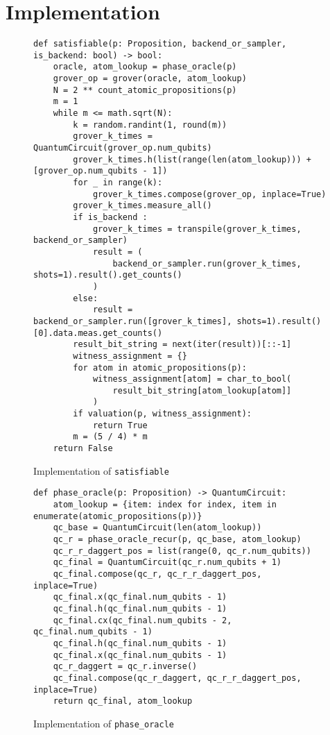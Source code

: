 \section{Implementation}\label{sec:implementation}

\begin{figure}
\centering
\begin{verbatim}
def satisfiable(p: Proposition, backend_or_sampler, is_backend: bool) -> bool:
    oracle, atom_lookup = phase_oracle(p)
    grover_op = grover(oracle, atom_lookup)
    N = 2 ** count_atomic_propositions(p)
    m = 1
    while m <= math.sqrt(N):
        k = random.randint(1, round(m))
        grover_k_times = QuantumCircuit(grover_op.num_qubits)
        grover_k_times.h(list(range(len(atom_lookup))) + [grover_op.num_qubits - 1])
        for _ in range(k):
            grover_k_times.compose(grover_op, inplace=True)
        grover_k_times.measure_all()
        if is_backend :
            grover_k_times = transpile(grover_k_times, backend_or_sampler)
            result = (
                backend_or_sampler.run(grover_k_times, shots=1).result().get_counts()
            )
        else:
            result = backend_or_sampler.run([grover_k_times], shots=1).result()[0].data.meas.get_counts()
        result_bit_string = next(iter(result))[::-1]
        witness_assignment = {}
        for atom in atomic_propositions(p):
            witness_assignment[atom] = char_to_bool(
                result_bit_string[atom_lookup[atom]]
            )
        if valuation(p, witness_assignment):
            return True
        m = (5 / 4) * m
    return False
\end{verbatim}
\caption{Implementation of \texttt{satisfiable} }
\label{fig:satisfiable}
\end{figure}

\begin{figure}
\centering
\begin{verbatim}
def phase_oracle(p: Proposition) -> QuantumCircuit:
    atom_lookup = {item: index for index, item in enumerate(atomic_propositions(p))}
    qc_base = QuantumCircuit(len(atom_lookup))
    qc_r = phase_oracle_recur(p, qc_base, atom_lookup)
    qc_r_r_daggert_pos = list(range(0, qc_r.num_qubits))
    qc_final = QuantumCircuit(qc_r.num_qubits + 1)
    qc_final.compose(qc_r, qc_r_r_daggert_pos, inplace=True)
    qc_final.x(qc_final.num_qubits - 1)
    qc_final.h(qc_final.num_qubits - 1)
    qc_final.cx(qc_final.num_qubits - 2, qc_final.num_qubits - 1)
    qc_final.h(qc_final.num_qubits - 1)
    qc_final.x(qc_final.num_qubits - 1)
    qc_r_daggert = qc_r.inverse()
    qc_final.compose(qc_r_daggert, qc_r_r_daggert_pos, inplace=True)
    return qc_final, atom_lookup
\end{verbatim}
\caption{Implementation of \texttt{phase_oracle} }
\label{fig:phase_oracle}
\end{figure}
